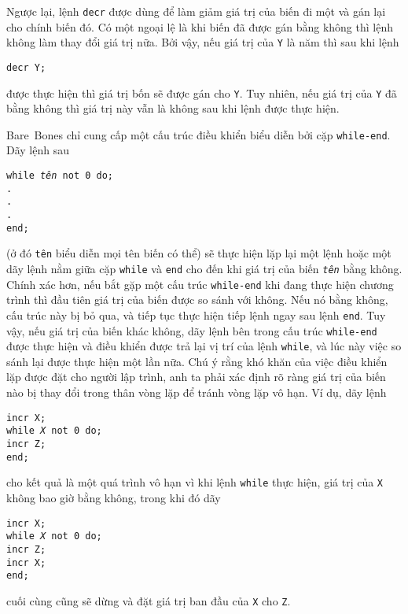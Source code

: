 Ngược lại, lệnh \texttt{decr} được dùng để làm giảm giá trị của biến đi một và gán lại cho
chính biến đó. Có một ngoại lệ là khi biến đã được gán bằng không thì lệnh không làm thay
đổi giá trị nữa. Bởi vậy, nếu giá trị của \texttt{Y} là năm thì sau khi lệnh
\begin{flushleft}
\qquad\qquad\qquad  \texttt{decr Y;}
\end{flushleft}
được thực hiện thì giá trị bốn sẽ được gán cho \texttt{Y}. Tuy nhiên, nếu giá trị của
\texttt{Y} đã bằng không thì giá trị này vẫn là không sau khi lệnh được thực hiện.

Bare~Bones chỉ cung cấp một cấu trúc điều khiển biểu diễn bởi cặp \texttt{while-end}. Dãy
lệnh sau
\begin{flushleft}
  \qquad \qquad\qquad \texttt{while \textit{tên} not 0 do;} \\
  \qquad\qquad\qquad\quad \texttt{.} \\
  \qquad\qquad\qquad\quad \texttt{.} \\
  \qquad\qquad\qquad\quad \texttt{.} \\
  \qquad\qquad\qquad\texttt{end;}
\end{flushleft}
(ở đó \texttt{tên} biểu diễn mọi tên biến có thể) sẽ thực hiện lặp lại một lệnh hoặc một
dãy lệnh nằm giữa cặp \texttt{while} và \texttt{end} cho đến khi giá trị của biến
\texttt{\it tên} bằng không. Chính xác hơn, nếu bắt gặp một cấu trúc \texttt{while-end}
khi đang thực hiện chương trình thì đầu tiên giá trị của biến được so sánh với không. Nếu
nó bằng không, cấu trúc này bị bỏ qua, và tiếp tục thực hiện tiếp lệnh ngay sau lệnh
\texttt{end}. Tuy vậy, nếu giá trị của biến khác không, dãy lệnh bên trong cấu trúc
\texttt{while-end} được thực hiện và điều khiển được trả lại vị trí của lệnh
\texttt{while}, và lúc này việc so sánh lại được thực hiện một lần nữa. Chú ý rằng khó
khăn của việc điều khiển lặp được đặt cho người lập trình, anh ta phải xác định rõ ràng
giá trị của biến nào bị thay đổi trong thân vòng lặp để tránh vòng lặp vô hạn. Ví dụ, dãy
lệnh
\begin{flushleft}
  \qquad \qquad\qquad \texttt{incr X;}\\
  \qquad \qquad\qquad \texttt{while \textit{X} not 0 do;} \\
  \qquad \qquad\qquad \quad \texttt{incr Z;} \\
  \qquad\qquad\qquad\texttt{end;}
\end{flushleft}
cho kết quả là một quá trình vô hạn vì khi lệnh \texttt{while} thực hiện, giá trị của
\texttt{X} không bao giờ bằng không, trong khi đó dãy
\begin{flushleft}
  \qquad \qquad\qquad \texttt{incr X;} \\
  \qquad \qquad\qquad \texttt{while \textit{X} not 0 do;} \\
  \qquad \qquad\qquad \quad \texttt{incr Z;} \\
  \qquad \qquad\qquad \quad \texttt{incr X;} \\
  \qquad\qquad\qquad\texttt{end;}
\end{flushleft}
cuối cùng cũng sẽ dừng và đặt giá trị ban đầu của \texttt{X} cho \texttt{Z}.

